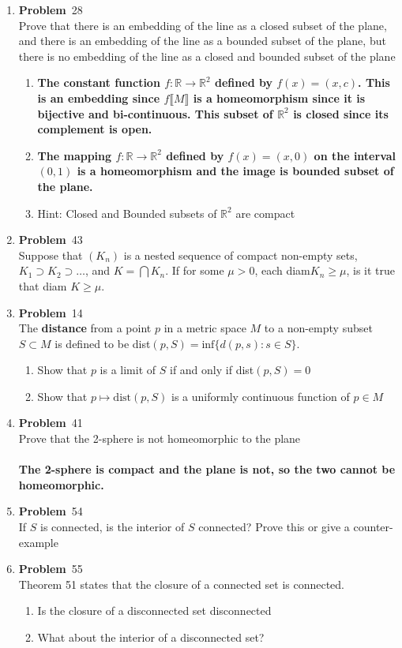 \documentclass[12pt]{amsart}
\newcommand{\benu}{\begin{enumerate}}
\newcommand{\eenu}{\end{enumerate}}
\theoremstyle{definition}
\newcommand{\mbR}{\mathbb{R}}
\newcommand{\itep}{\item {\bfseries Problem}\ }
\begin{document}
\begin{enumerate}[series=p]
\newpage

\itep 28\\
Prove that there is an embedding of the line as a closed subset of the plane, and there is an embedding of the line as a bounded subset of the plane, but there is no embedding of the line as a closed and bounded subset of the plane

	\benu
		\item \textbf{The constant function $f: \mbR \to \mbR^2$ defined by $f(x) = (x, c)$.  This is an embedding since $f \llbracket M \rrbracket$ is a homeomorphism since it is bijective and bi-continuous.  This subset of $\mbR^2$ is closed since its complement is open.}
		\item \textbf{The mapping $f: \mbR \to \mbR^2$ defined by $f(x) = (x, 0)$ on the interval $(0,1)$ is a homeomorphism and the image is bounded subset of the plane.}
		\item Hint: Closed and Bounded subsets of $\mbR^2$ are compact
	\eenu
\newpage

\itep 43 \\
Suppose that $(K_n)$ is a nested sequence of compact non-empty sets, $K_1 \supset K_2 \supset \dots $, and $K = \bigcap K_n$.  If for some $\mu > 0$, each diam$K_n \geq \mu$, is it true that diam $K \geq \mu$.
\newpage

\itep 14\\
The \textbf{distance} from a point $p$ in a metric space $M$ to a non-empty subset $S \subset M$ is defined to be dist$(p, S) = \text{inf}\{d(p,s): s \in S\}$.
	\benu
		\item Show that $p$ is a limit of $S$ if and only if dist$(p,S) = 0$
		\item Show that $p \mapsto \text{dist}(p, S)$ is a uniformly continuous function of $p \in M$
	\eenu
\newpage

\itep 41\\
Prove that the 2-sphere is not homeomorphic to the plane\\
\\
\textbf{The 2-sphere is compact and the plane is not, so the two cannot be homeomorphic.}

\newpage
\itep 54\\
If $S$ is connected, is the interior of $S$ connected?  Prove this or give a counter-example

\newpage

\itep 55\\
Theorem 51 states that the closure of a connected set is connected.
	\benu
		\item Is the closure of a disconnected set disconnected
		\item What about the interior of a disconnected set?
	\eenu
\newpage


\end{enumerate}
\end{document}
